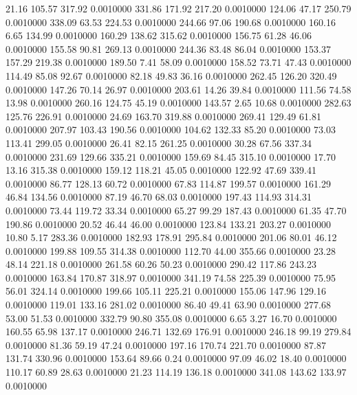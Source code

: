   21.16  105.57  317.92   0.0010000
 331.86  171.92  217.20   0.0010000
 124.06   47.17  250.79   0.0010000
 338.09   63.53  224.53   0.0010000
 244.66   97.06  190.68   0.0010000
 160.16    6.65  134.99   0.0010000
 160.29  138.62  315.62   0.0010000
 156.75   61.28   46.06   0.0010000
 155.58   90.81  269.13   0.0010000
 244.36   83.48   86.04   0.0010000
 153.37  157.29  219.38   0.0010000
 189.50    7.41   58.09   0.0010000
 158.52   73.71   47.43   0.0010000
 114.49   85.08   92.67   0.0010000
  82.18   49.83   36.16   0.0010000
 262.45  126.20  320.49   0.0010000
 147.26   70.14   26.97   0.0010000
 203.61   14.26   39.84   0.0010000
 111.56   74.58   13.98   0.0010000
 260.16  124.75   45.19   0.0010000
 143.57    2.65   10.68   0.0010000
 282.63  125.76  226.91   0.0010000
  24.69  163.70  319.88   0.0010000
 269.41  129.49   61.81   0.0010000
 207.97  103.43  190.56   0.0010000
 104.62  132.33   85.20   0.0010000
  73.03  113.41  299.05   0.0010000
  26.41   82.15  261.25   0.0010000
  30.28   67.56  337.34   0.0010000
 231.69  129.66  335.21   0.0010000
 159.69   84.45  315.10   0.0010000
  17.70   13.16  315.38   0.0010000
 159.12  118.21   45.05   0.0010000
 122.92   47.69  339.41   0.0010000
  86.77  128.13   60.72   0.0010000
  67.83  114.87  199.57   0.0010000
 161.29   46.84  134.56   0.0010000
  87.19   46.70   68.03   0.0010000
 197.43  114.93  314.31   0.0010000
  73.44  119.72   33.34   0.0010000
  65.27   99.29  187.43   0.0010000
  61.35   47.70  190.86   0.0010000
  20.52   46.44   46.00   0.0010000
 123.84  133.21  203.27   0.0010000
  10.80    5.17  283.36   0.0010000
 182.93  178.91  295.84   0.0010000
 201.06   80.01   46.12   0.0010000
 199.88  109.55  314.38   0.0010000
 112.70   44.00  355.66   0.0010000
  23.28   48.14  221.18   0.0010000
 261.58   60.26   50.23   0.0010000
 290.42  117.86  243.23   0.0010000
 163.84  170.87  318.97   0.0010000
 341.19   74.58  225.39   0.0010000
  75.95   56.01  324.14   0.0010000
 199.66  105.11  225.21   0.0010000
 155.06  147.96  129.16   0.0010000
 119.01  133.16  281.02   0.0010000
  86.40   49.41   63.90   0.0010000
 277.68   53.00   51.53   0.0010000
 332.79   90.80  355.08   0.0010000
   6.65    3.27   16.70   0.0010000
 160.55   65.98  137.17   0.0010000
 246.71  132.69  176.91   0.0010000
 246.18   99.19  279.84   0.0010000
  81.36   59.19   47.24   0.0010000
 197.16  170.74  221.70   0.0010000
  87.87  131.74  330.96   0.0010000
 153.64   89.66    0.24   0.0010000
  97.09   46.02   18.40   0.0010000
 110.17   60.89   28.63   0.0010000
  21.23  114.19  136.18   0.0010000
 341.08  143.62  133.97   0.0010000
